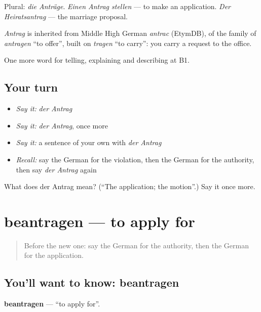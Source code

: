 Plural: \emph{die Anträge}. \emph{Einen Antrag stellen} — to make an application. \emph{Der Heiratsantrag} — the marriage proposal.

\begin{cousinweb}
\emph{Antrag} is inherited from Middle High German \emph{antrac} (EtymDB), of the family of \emph{antragen} \textquotedblleft{}to offer\textquotedblright{}, built on \emph{tragen} \textquotedblleft{}to carry\textquotedblright{}: you carry a request to the office.
\end{cousinweb}

\begin{grammarlens}[title={What you've built}]
One more word for telling, explaining and describing at B1.
\end{grammarlens}

\subsection*{Your turn}
\begin{itemize}
\raggedright
  \item \emph{Say it:} \emph{der Antrag}
  \item \emph{Say it:} \emph{der Antrag}, once more
  \item \emph{Say it:} a sentence of your own with \emph{der Antrag}
  \item \emph{Recall:} say the German for the violation, then the German for the authority, then say \emph{der Antrag} again
\end{itemize}

\begin{tcolorbox}[breakable,colback=teal!4,colframe=teal!35!black,title={Before you move on}]
What does der Antrag mean? (\textquotedblleft{}The application; the motion\textquotedblright{}.) Say it once more.
\end{tcolorbox}
\section[beantragen]{beantragen — to apply for}

\label{lesson:GE-C383-beantragen}



\begin{quote}
Before the new one: say the German for the authority, then the German for the application.
\end{quote}

\subsection*{You'll want to know: beantragen}
\textbf{beantragen} — \textquotedblleft{}to apply for\textquotedblright{}.

